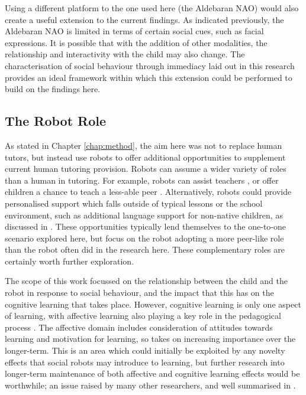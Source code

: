 Using a different platform to the one used here (the Aldebaran NAO) would also create a useful extension to the current findings. As indicated previously, the Aldebaran NAO is limited in terms of certain social cues, such as facial expressions. It is possible that with the addition of other modalities, the relationship and interactivity with the child may also change. The characterisation of social behaviour through immediacy laid out in this research provides an ideal framework within which this extension could be performed to build on the findings here.

\subsection{The Robot Role}
As stated in Chapter \ref{chap:method}, the aim here was not to replace human tutors, but instead use robots to offer additional opportunities to supplement current human tutoring provision. Robots can assume a wider variety of roles than a human in tutoring. For example, robots can assist teachers \citep{alemi2014employing}, or offer children a chance to teach a less-able peer \citep{tanaka2012children, hood2015children}. Alternatively, robots could provide personalised support which falls outside of typical lessons or the school environment, such as additional language support for non-native children, as discussed in \cite{belpaeme2015L2TOR}. These opportunities typically lend themselves to the one-to-one scenario explored here, but focus on the robot adopting a more peer-like role than the robot often did in the research here. These complementary roles are certainly worth further exploration.

The scope of this work focussed on the relationship between the child and the robot in response to social behaviour, and the impact that this has on the cognitive \gls{learning} that takes place. However, cognitive \gls{learning} is only one aspect of \gls{learning}, with affective \gls{learning} also playing a key role in the pedagogical process \citep{krathwohl1964taxonomy}. The affective domain includes consideration of attitudes towards \gls{learning} and motivation for \gls{learning}, so takes on increasing importance over the longer-term. This is an area which could initially be exploited by any novelty effects that social robots may introduce to \gls{learning}, but further research into longer-term maintenance of both affective and cognitive \gls{learning} effects would be worthwhile; an issue raised by many other researchers, and well summarised in \cite{leite2013social}.

